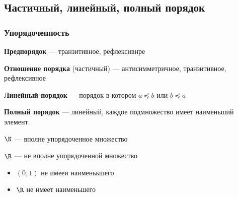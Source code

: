 \documentclass[english]{article}
\begin{document}
\subsection{Частичный, линейный, полный порядок}
\label{sec:org8a54933}
\subsubsection{Упорядоченность}
\label{sec:org4e8c251}
\begin{definition}
	\textbf{Предпорядок} --- транзитивное, рефлексивнре
\end{definition}
\begin{definition}
	\textbf{Отношение порядка} (частичный) --- антисимметричное, транзитивное, рефлексивное
\end{definition}
\begin{definition}
	\textbf{Линейный порядок} --- порядок в котором \(a \preceq b\) или \(b \preceq a\)
\end{definition}
\begin{definition}
	\textbf{Полный порядок} --- линейный, каждое подмножество имеет наименьший элемент.
\end{definition}
\begin{examp}
	\(\N\) --- вполне упорядоченное множество
\end{examp}
\begin{examp}
	\(\R\) --- не вполне упорядоченной множество
	\begin{itemize}
		\item \((0, 1)\) не имееи наименььшего
		\item \(\R\) не имеет наименьшего
	\end{itemize}
\end{examp}
\end{document}
